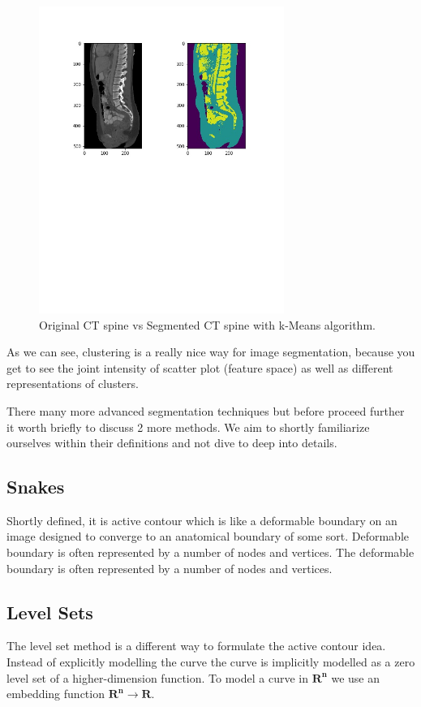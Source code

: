 \newpage
\begin{figure}[h]
    \centering \includegraphics[width=8cm]{images/ct-spine-k-means-segmented.jpg}
    \vspace*{-40mm} \caption {Original CT spine vs Segmented CT spine with k-Means algorithm.}
\end{figure}    

As we can see, clustering is a really nice way for image segmentation, because you get to see the joint intensity of scatter plot (feature space) as well as different representations of clusters.  

There many more advanced segmentation techniques but before proceed further it worth briefly to discuss 2 more methods. We aim to shortly familiarize ourselves within their definitions and not dive to deep into details.      
\subsection{Snakes}
Shortly defined, it is active contour which is like a deformable boundary on an image designed to converge to an anatomical boundary of some sort. Deformable boundary is often represented by a number of nodes and vertices.  
The deformable boundary is often represented by a number of nodes and vertices.  

\subsection{Level Sets}
The level set method is a different way to formulate the active contour idea. Instead of explicitly modelling the curve the curve is implicitly modelled as a zero level set of a higher-dimension function. To model a curve in $\mathbf{R^n}$ we use an embedding function $\mathbf{R^n} \to \mathbf{R}$.     

